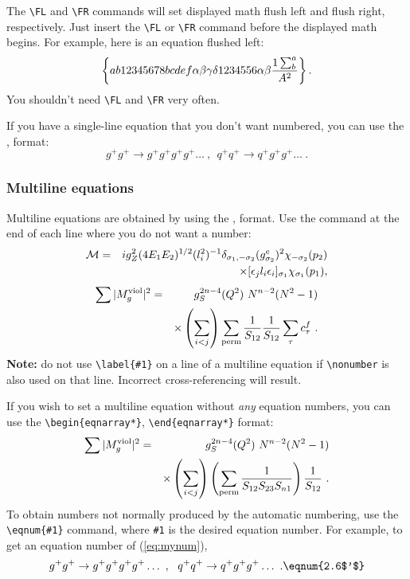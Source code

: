The \verb+\FL+ and  \verb+\FR+ commands will set displayed math flush
left and flush right, respectively. Just insert the \verb+\FL+ or  \verb+\FR+
command before the displayed math begins. For example, here is an equation
flushed left:
\FL
\begin{equation}
\left\{ab12345678bcdef\alpha\beta\gamma\delta%
1234556\alpha\beta{1\sum^{a}_{b}\over A^2}\right\}.
\end{equation}
You shouldn't need \verb+\FL+ and  \verb+\FR+  very often.


If you have a single-line equation that you don't want
numbered, you can use the \btt{[}, \btt{]} format:
\[g^+g^+ \rightarrow g^+g^+g^+g^+ \dots ~,~~q^+q^+\rightarrow
q^+g^+g^+ \dots ~. \]

\subsubsection{Multiline equations}

Multiline equations are obtained by using the
,  format.
Use the 
command at the end of each line where you do not want a number:
\begin{eqnarray}
{\cal M}=&&ig_Z^2(4E_1E_2)^{1/2}(l_i^2)^{-1}
\delta_{\sigma_1,-\sigma_2}
(g_{\sigma_2}^e)^2\chi_{-\sigma_2}(p_2)\nonumber\\
&&\times
[\epsilon_jl_i\epsilon_i]_{\sigma_1}\chi_{\sigma_1}(p_1),
\end{eqnarray}
\begin{eqnarray}
\sum \vert M^{\rm viol}_g \vert ^2&=&g^{2n-4}_S(Q^2)~N^{n-2}
        (N^2-1)\nonumber \\
 & &\times \left( \sum_{i<j}\right)
  \sum_{\rm perm}
 {1 \over S_{12}}
 {1 \over S_{12}}\sum_\tau c^f_\tau~.
\end{eqnarray}
{\bf Note:} do not use \verb+\label{#1}+ on a line of a multiline
equation if \verb+\nonumber+ is also used on that line. Incorrect
cross-referencing will result.

If you wish to set a multiline equation without {\em any\/} equation numbers,
you can use the \verb+\begin{eqnarray*}+,
\verb+\end{eqnarray*}+ format:
\begin{eqnarray*}
\sum \vert M^{\rm viol}_g \vert ^2&=&g^{2n-4}_S(Q^2)~N^{n-2}
        (N^2-1)\\
 & &\times \left( \sum_{i<j}\right)
 \left( \sum_{\rm perm}
 {1 \over S_{12}S_{23}S_{n1}}\right)
 {1 \over S_{12}}~.
\end{eqnarray*}
To obtain numbers not normally produced by the automatic numbering,
use the \verb+\eqnum{#1}+ command, where \verb+#1+ is the desired
equation number. For example, to get an equation number of
(\ref{eq:mynum}),
\begin{equation}
g^+g^+ \rightarrow g^+g^+g^+g^+ \dots ~,~~q^+q^+\rightarrow
q^+g^+g^+ \dots ~. \eqnum{2.6$'$}\label{eq:mynum}
\end{equation}

